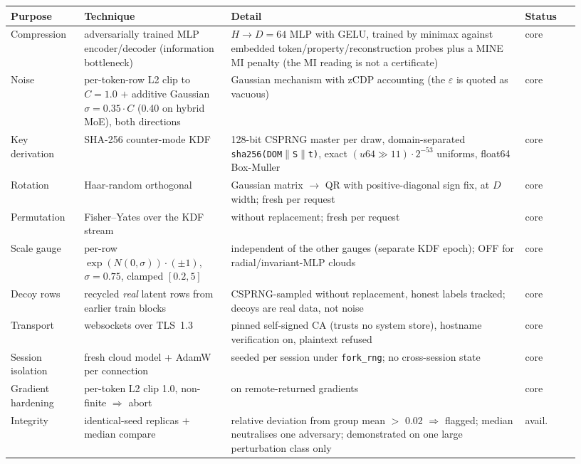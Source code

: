 \documentclass[11pt]{article}
\begin{document}
\begin{table}[H]
\centering\scriptsize


\setlength{\tabcolsep}{3pt}
\begin{tabular}{@{}p{0.12\linewidth}p{0.24\linewidth}p{0.48\linewidth}p{0.09\linewidth}@{}}
\toprule
Purpose & Technique & Detail & Status \\
\midrule
Compression & adversarially trained MLP encoder/decoder (information bottleneck) & $H{\to}D{=}64$ MLP with GELU, trained by minimax against embedded token/property/reconstruction probes plus a MINE MI penalty (the MI reading is not a certificate) & core \\
Noise & per-token-row L2 clip to $C{=}1.0$ $+$ additive Gaussian $\sigma{=}0.35{\cdot}C$ (0.40 on hybrid MoE), both directions & Gaussian mechanism with zCDP accounting (the $\varepsilon$ is quoted as vacuous) & core \\
Key derivation & SHA-256 counter-mode KDF & 128-bit CSPRNG master per draw, domain-separated \texttt{sha256(DOM$\|$S$\|$t)}, exact $(u64{\gg}11){\cdot}2^{-53}$ uniforms, float64 Box-Muller & core \\
Rotation & Haar-random orthogonal & Gaussian matrix $\to$ QR with positive-diagonal sign fix, at $D$ width; fresh per request & core \\
Permutation & Fisher--Yates over the KDF stream & without replacement; fresh per request & core \\
Scale gauge & per-row $\exp(N(0,\sigma))\cdot(\pm1)$, $\sigma{=}0.75$, clamped $[0.2,5]$ & independent of the other gauges (separate KDF epoch); OFF for radial/invariant-MLP clouds & core \\
Decoy rows & recycled \emph{real} latent rows from earlier train blocks & CSPRNG-sampled without replacement, honest labels tracked; decoys are real data, not noise & core \\
Transport & websockets over TLS~1.3 & pinned self-signed CA (trusts no system store), hostname verification on, plaintext refused & core \\
Session isolation & fresh cloud model + AdamW per connection & seeded per session under \texttt{fork\_rng}; no cross-session state & core \\
Gradient hardening & per-token L2 clip 1.0, non-finite $\Rightarrow$ abort & on remote-returned gradients & core \\
Integrity & identical-seed replicas $+$ median compare & relative deviation from group mean $>$ 0.02 $\Rightarrow$ flagged; median neutralises one adversary; demonstrated on one large perturbation class only & avail. \\

\end{tabular}
\end{table}
\end{document}
